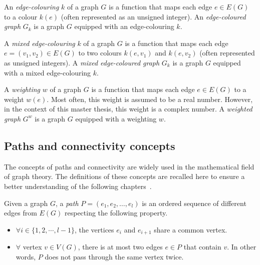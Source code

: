 \begin{definition}
    \label{def:edge_coloured_graph}
    An \textit{edge-colouring} $k$ of a graph $G$ is a function that maps each edge $e \in E(G)$ to a colour $k(e)$ (often represented as an unsigned integer).
    An \textit{edge-coloured graph} $G_k$ is a graph $G$ equipped with an edge-colouring $k$.
\end{definition}

\begin{definition}
    \label{def:mixed_edge_coloured_graph}
    A \textit{mixed edge-colouring} $k$ of a graph $G$ is a function that maps each edge $e = (v_1, v_2) \in E(G)$ to two colours $k(e, v_1)$ and $k(e, v_2)$ (often represented as unsigned integers).
    A \textit{mixed edge-coloured graph} $G_k$ is a graph $G$ equipped with a mixed edge-colouring $k$.
\end{definition}

\begin{definition}
    \label{def:weighted_graph}
    A \textit{weighting} $w$ of a graph $G$ is a function that maps each edge $e \in E(G)$ to a weight $w(e)$.
    Most often, this weight is assumed to be a real number.
    However, in the context of this master thesis, this weight is a complex number.
    A \textit{weighted graph} $G^w$ is a graph $G$ equipped with a weighting $w$.
\end{definition}


\subsection{Paths and connectivity concepts}
\label{subsec:paths-and-connectivity-concepts}

The concepts of paths and connectivity are widely used in the mathematical field of graph theory.
The definitions of these concepts are recalled here to ensure a better understanding of the following chapters~\cite{bondy1976graph}.

\begin{definition}[Path]
    \label{def:path}
    Given a graph $G$, a \textit{path} $P = (e_1, e_2, \dots, e_l)$ is an ordered sequence of different edges from $E(G)$ respecting the following property.
    \begin{itemize}
        \item $\forall i \in \{1, 2, \cdots, l - 1\}$, the vertices $e_i$ and $e_{i+1}$ share a common vertex.
        \item $\forall$ vertex $v \in V(G)$, there is at most two edges $e \in P$ that contain $v$.
            In other words, $P$ does not pass through the same vertex twice.
    \end{itemize}
\end{definition}

